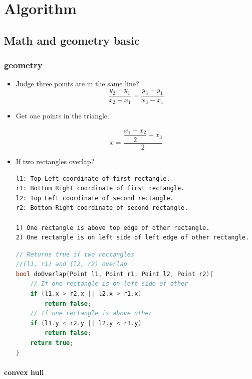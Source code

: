 \documentclass[a4paper,12pt,twoside]{book}
\begin{document}
\chapter{Algorithm}
\section{Math and geometry basic}
\subsection{geometry}
\begin{itemize}
\item Judge three points are in the same line?
\[
\dfrac{y_{2}-y_{1}}{x_{2}-x_{1}}  = \dfrac{y_{3}-y_{1}}{x_{3}-x_{1}}
\]

\item Get one points in the triangle. 

\[
x = \dfrac{\dfrac{x_{1}+x_{2}}{2}+x_{3}}{2}
\]

\item If two rectangles overlap?
\begin{verbatim}
l1: Top Left coordinate of first rectangle.
r1: Bottom Right coordinate of first rectangle.
l2: Top Left coordinate of second rectangle.
r2: Bottom Right coordinate of second rectangle.

1) One rectangle is above top edge of other rectangle.
2) One rectangle is on left side of left edge of other rectangle.
\end{verbatim}

\begin{lstlisting}[frame=single, language=c++]
// Returns true if two rectangles 
//(l1, r1) and (l2, r2) overlap
bool doOverlap(Point l1, Point r1, Point l2, Point r2){
    // If one rectangle is on left side of other
    if (l1.x > r2.x || l2.x > r1.x)
        return false;
    // If one rectangle is above other
    if (l1.y < r2.y || l2.y < r1.y)
        return false;
    return true;
}
\end{lstlisting}

\end{itemize}

\subsubsection{convex hull}
\end{document}
